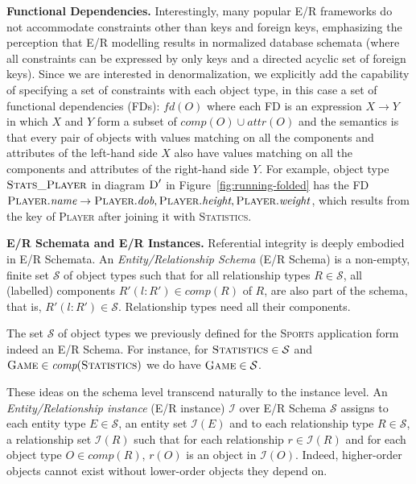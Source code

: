 \documentclass[sigconf]{acmart}
\begin{document}
\textbf{Functional Dependencies.} Interestingly, many popular E/R frameworks do not accommodate constraints other than keys and foreign keys, emphasizing the perception that E/R modelling results in normalized database schemata (where all constraints can be expressed by only keys and a directed acyclic set of foreign keys). Since we are interested in denormalization, we explicitly add the capability of specifying a set of constraints with each object type, in this case a set of functional dependencies (FDs): $\textit{fd}(O)$ where each FD is an expression $X\rightarrow Y$ in which $X$ and $Y$ form a subset of $\textit{comp}(O)\cup\textit{attr}(O)$ and the semantics is that every pair of objects with values matching on all the components and attributes of the left-hand side $X$ also have values matching on all the components and attributes of the right-hand side $Y$. For example, object type $\textsc{Stats\_Player}$ in diagram $\textsc{D}'$ in Figure~\ref{fig:running-folded} has the FD $\textsc{Player}.\textit{name}\rightarrow\textsc{Player}.\textit{dob}, \textsc{Player}.\textit{height}, \textsc{Player}.\textit{weight}$, which results from the key of \textsc{Player} after joining it with \textsc{Statistics}.

\textbf{E/R Schemata and E/R Instances.} Referential integrity is deeply embodied in E/R Schemata. An \emph{Entity/Relationship Schema} (E/R Schema) is a non-empty, finite set $\mathcal{S}$ of object types such that for all relationship types $R\in\mathcal{S}$, all (labelled) components  $R'(l:R')\in\textit{comp}(R)$ of $R$, are also part of the schema, that is,  $R'(l:R')\in\mathcal{S}$. Relationship types need all their components.

The set $\mathcal{S}$ of object types we previously defined for the \textsc{Sports} application form indeed an E/R Schema. For instance, for $\textsc{Statistics}\in\mathcal{S}$ and  $\textsc{Game}\in\textit{comp}(\textsc{Statistics})$ we do have  $\textsc{Game}\in\mathcal{S}$.

These ideas on the schema level transcend naturally to the instance level. An \emph{Entity/Relationship instance} (E/R instance) $\mathcal{I}$ over E/R Schema $\mathcal{S}$ assigns to each entity type $E\in\mathcal{S}$, an entity set $\mathcal{I}(E)$ and to each relationship type $R\in\mathcal{S}$, a relationship set $\mathcal{I}(R)$ such that for each relationship $r\in\mathcal{I}(R)$ and for each object type $O\in\textit{comp}(R)$, $r(O)$ is an object in $\mathcal{I}(O)$. Indeed, higher-order objects cannot exist without lower-order objects they depend on.
\end{document}
